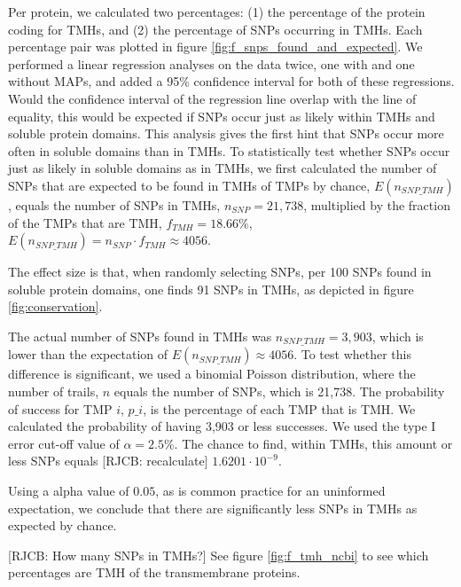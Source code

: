 Per protein, we calculated two percentages: 
(1) the percentage of the protein coding for TMHs, 
and (2) the percentage of SNPs occurring in TMHs.
Each percentage pair was plotted in figure \ref{fig:f_snps_found_and_expected}.
We performed a linear regression analyses on the data twice,
one with and one without MAPs,
and added a 95\% confidence interval for both of these regressions.
Would the confidence interval of the regression line 
overlap with the line of equality,
this would be expected if SNPs occur just as likely within TMHs 
and soluble protein domains.
This analysis gives the first hint that SNPs 
occur more often in soluble domains than in TMHs.
To statistically test whether SNPs occur 
just as likely in soluble domains as
in TMHs, we first calculated the number of SNPs that are expected to be
found in TMHs of TMPs by chance, $E(n_{SNP\_TMH})$,
equals the number of SNPs in TMHs, $n_{SNP} = 21,738$, 
multiplied by the fraction of the TMPs that are TMH, $f_{TMH} = 18.66\%$,
$E(n_{SNP\_TMH}) = n_{SNP} \cdot f_{TMH} \approx 4056$.

The effect size is that, 
when randomly selecting SNPs, 
per 100 SNPs found in soluble protein domains, 
one finds 91 SNPs in TMHs,
as depicted in figure \ref{fig:conservation}.

The actual number of SNPs found in TMHs
was $n_{SNP\_TMH} = 3,903$, which is lower than the expectation
of $E(n_{SNP\_TMH}) \approx 4056$.
To test whether this difference is significant,
we used a binomial Poisson distribution, where the number of trails,
$n$ equals the number of SNPs, which is 21,738. The probability of success
for TMP $i$, $p\_i$, is the percentage of each TMP that is TMH.
We calculated the probability of having 3,903 or less successes.
We used the type I error cut-off value of $\alpha = 2.5\%$.
The chance to find, within TMHs, this amount or less SNPs 
equals [RJCB: recalculate]
$1.6201 \cdot 10^{-9}$.

Using a alpha value of $0.05$, as is common practice for an uninformed
expectation, we conclude that there are significantly less SNPs
in TMHs as expected by chance.

[RJCB: How many SNPs in TMHs?]
See figure \ref{fig:f_tmh_ncbi} to see which percentages
are TMH of the transmembrane proteins.

